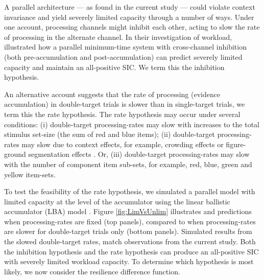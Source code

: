 A parallel architecture --- as found in the current study --- could violate context invariance and yield severely limited capacity through a number of ways. Under one account, processing channels might inhibit each other, acting to slow the rate of processing in the alternate channel. In their investigation of workload, \citeauthor{eidels2011} \citeyear[Figure 3]{eidels2011} illustrated how a parallel minimum-time system with cross-channel inhibition (both pre-accumulation and post-accumulation) can predict severely limited capacity and maintain an all-positive SIC. We term this the inhibition hypothesis. 

An alternative account suggests that the rate of processing (evidence accumulation) in double-target trials is slower than in single-target trials, we term this the rate hypothesis. The rate hypothesis may occur under several conditions: (i) double-target processing-rates may slow with increases to the total stimulus set-size (the sum of red and blue items); (ii) double-target processing-rates may slow due to context effects, for example, crowding effects \cite{anobile2015mechanisms} or figure-ground segmentation effects \cite{kimchi2008figureground}. Or, (iii) double-target processing-rates may slow with the number of component item sub-sets, for example, red, blue, green and yellow item-sets. 

To test the feasibility of the rate hypothesis, we simulated a parallel model with limited capacity at the level of the accumulator using the linear ballistic accumulator (LBA) model \cite{Brown2008}. Figure \ref{fig:LimVsUnlim} illustrates \SIC and \Ct predictions when processing-rates are fixed (top panels), compared to when processing-rates are slower for double-target trials only (bottom panels). Simulated results from the slowed double-target rates, match observations from the current study. Both the inhibition hypothesis and the rate hypothesis can produce an all-positive SIC with severely limited workload capacity. To determine which hypothesis is most likely, we now consider the resilience difference function.

